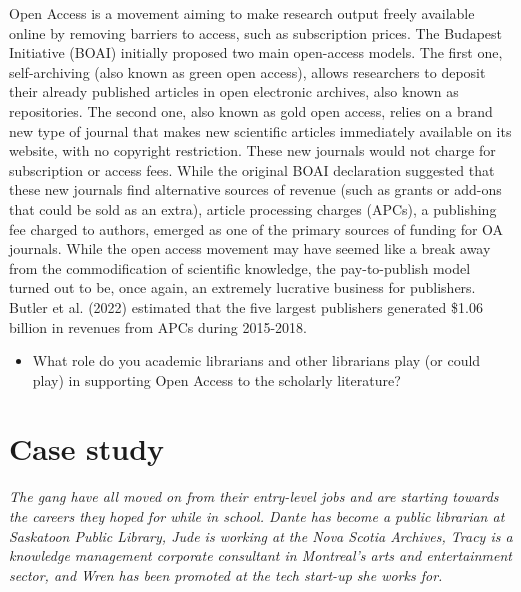 \documentclass[
  letterpaper,
  DIV=11,
  numbers=noendperiod]{scrreprt}
\providecommand{\tightlist}{%
  \setlength{\itemsep}{0pt}\setlength{\parskip}{0pt}}
\begin{document}
Open Access is a movement aiming to make research output freely
available online by removing barriers to access, such as subscription
prices. The Budapest Initiative (BOAI) initially proposed two main
open-access models. The first one, self-archiving (also known as green
open access), allows researchers to deposit their already published
articles in open electronic archives, also known as repositories. The
second one, also known as gold open access, relies on a brand new type
of journal that makes new scientific articles immediately available on
its website, with no copyright restriction. These new journals would not
charge for subscription or access fees. While the original BOAI
declaration suggested that these new journals find alternative sources
of revenue (such as grants or add-ons that could be sold as an extra),
article processing charges (APCs), a publishing fee charged to authors,
emerged as one of the primary sources of funding for OA journals. While
the open access movement may have seemed like a break away from the
commodification of scientific knowledge, the pay-to-publish model turned
out to be, once again, an extremely lucrative business for publishers.
Butler et al. (2022) estimated that the five largest publishers
generated \$1.06 billion in revenues from APCs during 2015-2018.

\begin{tcolorbox}[enhanced jigsaw, arc=.35mm, bottomrule=.15mm, bottomtitle=1mm, breakable, colback=white, colbacktitle=quarto-callout-tip-color!10!white, colframe=quarto-callout-tip-color-frame, coltitle=black, left=2mm, leftrule=.75mm, opacityback=0, opacitybacktitle=0.6, rightrule=.15mm, title=\textcolor{quarto-callout-tip-color}{\faLightbulb}\hspace{0.5em}{Pause and reflect}, titlerule=0mm, toprule=.15mm, toptitle=1mm]

\begin{itemize}
\tightlist
\item
  What role do you academic librarians and other librarians play (or
  could play) in supporting Open Access to the scholarly literature?
\end{itemize}

\end{tcolorbox}

\section{Case study}\label{case-study-4}

\emph{The gang have all moved on from their entry-level jobs and are
starting towards the careers they hoped for while in school. Dante has
become a public librarian at Saskatoon Public Library, Jude is working
at the Nova Scotia Archives, Tracy is a knowledge management corporate
consultant in Montreal's arts and entertainment sector, and Wren has
been promoted at the tech start-up she works for.}
\end{document}

